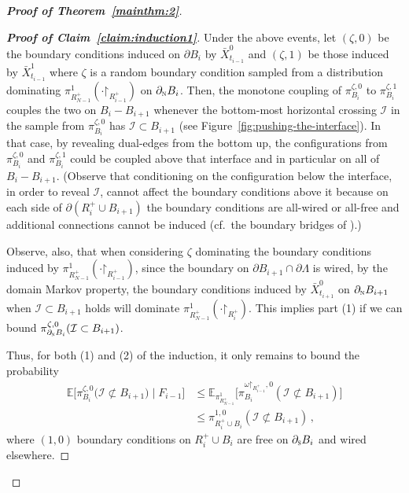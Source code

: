 \documentclass[reqno,11pt]{amsart}
\numberwithin{equation}{section}
\renewcommand{\restriction}{\mathord{\upharpoonright}}
\newcommand{\given}{\;\big|\;}
\theoremstyle{definition}{
\newtheorem{example}[theorem]{Example}
\newtheorem{definition}[theorem]{Definition}
\newtheorem*{definition*}{Definition}
\newtheorem{problem}[theorem]{Problem}
\newtheorem{question}[theorem]{Question}
\newtheorem{remark}[theorem]{Remark}
}
\newcommand{\north}{{\textsc{n}}}
\newcommand{\south}{{\textsc{s}}}
\begin{document}
\begin{proof}[\textbf{\emph{Proof of Theorem~\ref{mainthm:2}}}]
\begin{proof}[\textbf{\emph{Proof of Claim~\ref{claim:induction1}}}]
 
Under the above events, let $(\zeta,0)$ be the boundary conditions induced on $\partial B_{i}$ by $\bar X_{t_{i-1}}^0$ and $(\zeta,1)$ be those induced by $\bar X_{t_{i-1}}^1$ where $\zeta$ is a random boundary condition sampled from a distribution dominating $\pi_{R_{N-1}^+}^1 (\cdot \restriction_{R_{i-1}^+})$ on $\partial_\north B_{i}$. Then, the monotone coupling of $\pi^{\zeta,0}_{B_{i}}$ to $\pi^{\zeta,1}_{B_{i}}$ couples the two on $B_{i}-B_{i+1}$ whenever the bottom-most horizontal crossing $\mathcal I$ in the sample from $\pi_{B_{i}}^{\zeta,0}$ has $\mathcal I \subset B_{i+1}$ (see Figure~\ref{fig:pushing-the-interface}). In that case, by revealing dual-edges from the bottom up, the configurations from $\pi^{\zeta,0}_{B_{i}}$ and $\pi^{\zeta,1}_{B_{i}}$ could be coupled above that interface and in particular on all of $B_{i}-B_{i+1}$.  
(Observe that conditioning on the configuration below the interface, in order to reveal $\mathcal I$, cannot affect the boundary conditions above it because on each side of $\partial (R_i^+\cup B_{i+1})$ the boundary conditions are all-wired or all-free and additional connections cannot be induced (cf.\ the boundary bridges of \cite{GL16b}).)

Observe, also, that when considering $\zeta$ dominating the boundary conditions induced by $\pi_{R_{N-1}^+}^1(\cdot \restriction_{R_{i-1}^+})$, since the boundary on $\partial B_{i+1}\cap \partial \Lambda$ is wired, by the domain Markov property, the boundary conditions induced by $\bar X_{t_{i+1}}^0$ on $\partial_\north B_{i+1}$ when $\mathcal I \subset B_{i+1}$ holds will dominate $\pi_{R_{N-1}^+}^1(\cdot \restriction_{R_{i}^+})$. This implies part (1) if we can bound $\pi^{\zeta,0}_{\partial_\north B_{i}}(\mathcal I \subset B_{i+1})$. 

Thus, for both (1) and (2) of the induction, it only remains to bound the probability
\begin{align}\label{eq:chain-interface-fluctuation}
\mathbb E\bigg[\pi_{B_{i}}^{\zeta,0}\big(\mathcal I \not \subset B_{i+1}\big)\given F_{i-1}\bigg] & \leq \mathbb E_{\pi_{R_{N-1}^+}^1} \bigg[\pi_{B_{i}}^{\omega\restriction_{R_{i-1}^+},0}(\mathcal I \not \subset B_{i+1})\bigg] \nonumber \\ 
&\leq \pi^{1,0}_{R_i^+\cup B_{i}}(\mathcal I \not \subset B_{i+1})\,,
\end{align}
where ${(1,0)}$ boundary conditions on $R_{i}^+\cup B_{i}$ are free on $\partial_\south B_{i}$ and wired elsewhere.  


\end{proof}
\end{proof}
\end{document}
